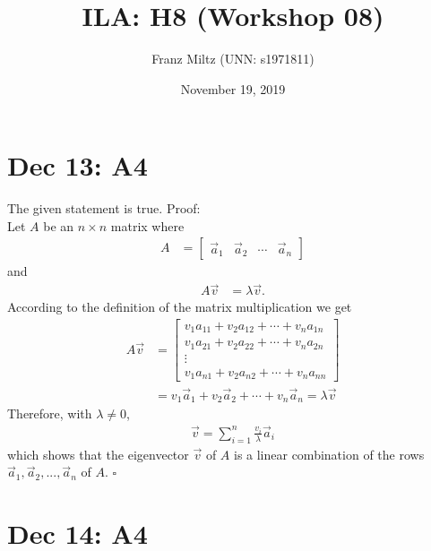 \documentclass{article}
\title{ILA: H8 (Workshop 08)}
\author{Franz Miltz (UNN: s1971811)}
\date{November 19, 2019}
\begin{document}
\maketitle
\section*{Dec 13: A4}
The given statement is true. Proof:\\
Let $A$ be an $n\times n$ matrix where
\begin{align*}
    A & =\begin{bmatrix}
        \vec a_1 & \vec a_2 & \cdots & \vec a_n
    \end{bmatrix}
\end{align*}
and
\begin{align*}
    A\vec v & = \lambda\vec v.
\end{align*}
According to the definition of the matrix multiplication we get
\begin{align*}
    A\vec v & = \begin{bmatrix}
        v_1a_{11} + v_2a_{12} + \cdots + v_na_{1n} \\
        v_1a_{21} + v_2a_{22} + \cdots + v_na_{2n} \\
        \vdots                                     \\
        v_1a_{n1} + v_2a_{n2} + \cdots + v_na_{nn}
    \end{bmatrix}                                         \\
            & = v_1\vec a_1 + v_2\vec a_2 + \cdots + v_n\vec a_n = \lambda \vec v
\end{align*}
Therefore, with $\lambda\not=0$,
\begin{align*}
    \vec v = \sum_{i=1}^n \frac{v_i}{\lambda} \vec a_i
\end{align*}
which shows that the eigenvector $\vec v$ of $A$ is a linear combination of the rows $\vec a_1, \vec a_2, ..., \vec a_n$ of $A$. $\square$
\section*{Dec 14: A4}
\end{document}
